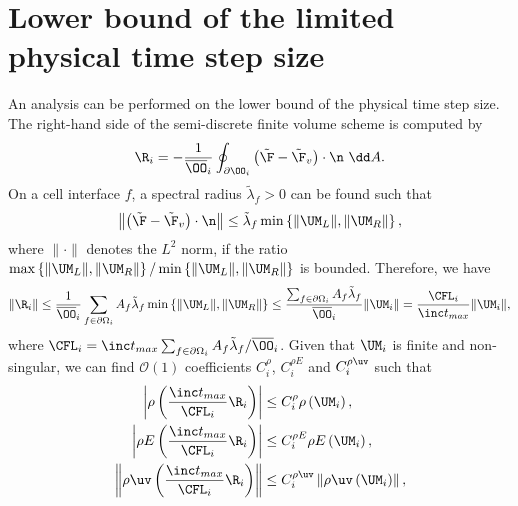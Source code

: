 
\appendix

\section{Lower bound of the limited physical time step size}
\label{sec:lower-bound-physical}
An analysis can be performed on the lower bound of the physical time step size.
The right-hand side of the semi-discrete finite volume scheme is computed by
\begin{equation}
    \label{eq:Semi-FV-1}
    \R_i = -\frac{1}{\overline{\OO}_i} \oint_{\partial \OO_i} \left(\tilde{\F} - \tilde{\F}_v \right) \cdot \n \ \dd A.
\end{equation}
On a cell interface $f$, a spectral radius $\tilde{\lambda}_f>0$ can be found such that
\begin{equation}
    \left\| \left(\tilde{\F} - \tilde{\F}_v \right) \cdot \n \right\| \leq \tilde{\lambda}_f \min \left\{\|\UM_L\|, \|\UM_R\| \right\},
\end{equation}
where $\|\cdot\|$ denotes the $L^2$ norm, if the ratio $\max \left\{\|\UM_L\|, \|\UM_R\| \right\}/\min \left\{\|\UM_L\|, \|\UM_R\| \right\}$ is bounded.
Therefore, we have
\begin{equation}
    \left\| \R_i \right\| 
    \leq \frac{1}{\overline{\OO}_i} \sum_{f \in \partial \Omega_i}{
        A_{f} \tilde{\lambda}_{f} \min \left\{\|\UM_L\|, \|\UM_R\| \right\}
    } 
    \leq \frac{\sum_{f \in \partial \Omega_i} A_f\tilde{\lambda}_f}{\overline{\OO}_i}\|\UM_i\|
    =
    \frac{\CFL_i}{\inc t_{max}}\|\UM_i\|,
\end{equation}
where $\CFL_i= \inc t_{max}\sum_{f \in \partial \Omega_i} A_f \tilde{\lambda}_f/\overline{\OO}_i$. 
Given that $\UM_i$ is finite and non-singular, we can find $\mathcal{O}(1)$ coefficients $C^{\rho}_i$, $C^{\rho E}_i$ and $C^{\rho \uv}_i$ such that
\begin{equation}
    \begin{aligned}
        \left| \rho\left( \frac{\inc t_{max}}{\CFL_i} \R_i \right) \right|
        & \leq
        C^\rho_i \rho\left( \UM_i \right),\\
        \left| \rho E\left( \frac{\inc t_{max}}{\CFL_i} \R_i \right) \right|
        & \leq
        C^{\rho E}_i \rho E\left( \UM_i \right),\\
        \left\| \rho \uv\left( \frac{\inc t_{max}}{\CFL_i} \R_i \right) \right\|
        & \leq
        C^{\rho \uv}_i \left\| \rho \uv\left( \UM_i \right)              \right\|,\\
    \end{aligned}
\end{equation}
